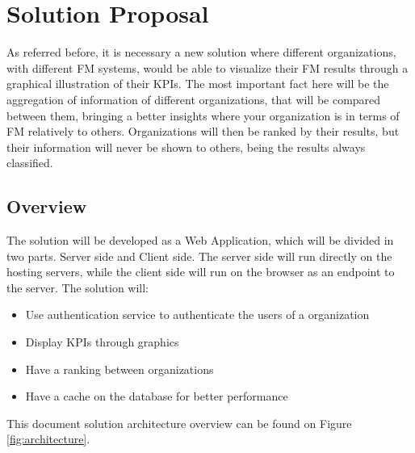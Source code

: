 
% 
% 

\section{Solution Proposal} 
\label{solutionproposal}

As referred before, it is necessary a new solution where different organizations, with different FM systems, would be able to visualize their FM results through a graphical illustration of their KPIs. The most important fact here will be the aggregation of information of different organizations, that will be compared between them, bringing a better insights where your organization is in terms of FM relatively to others. Organizations will then be ranked by their results, but their information will never be shown to others, being the results always classified.

\subsection{Overview}

The solution will be developed as a Web Application, which will be divided in two parts. Server side and Client side. The server side will run directly on the hosting servers, while the client side will run on the browser as an endpoint to the server.
The solution will:


\begin{itemize}
	\item Use authentication service to authenticate the users of a organization
	\item Display KPIs through graphics		
	\item Have a ranking between organizations
	\item Have a cache on the database for better performance
\end{itemize}

This document solution architecture overview can be found on Figure \ref{fig:architecture}. 

